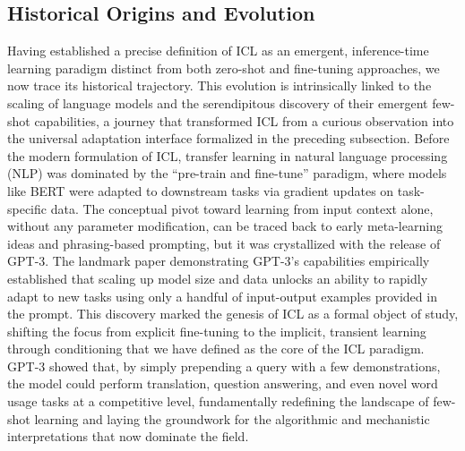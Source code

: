 \documentclass[11pt]{article}
\begin{document}
\subsection{Historical Origins and Evolution}

Having established a precise definition of ICL as an emergent, inference-time learning paradigm distinct from both zero-shot and fine-tuning approaches, we now trace its historical trajectory. This evolution is intrinsically linked to the scaling of language models and the serendipitous discovery of their emergent few-shot capabilities, a journey that transformed ICL from a curious observation into the universal adaptation interface formalized in the preceding subsection. Before the modern formulation of ICL, transfer learning in natural language processing (NLP) was dominated by the ``pre-train and fine-tune'' paradigm, where models like BERT were adapted to downstream tasks via gradient updates on task-specific data. The conceptual pivot toward learning from input context alone, without any parameter modification, can be traced back to early meta-learning ideas and phrasing-based prompting, but it was crystallized with the release of GPT-3. The landmark paper demonstrating GPT-3's capabilities empirically established that scaling up model size and data unlocks an ability to rapidly adapt to new tasks using only a handful of input-output examples provided in the prompt. This discovery marked the genesis of ICL as a formal object of study, shifting the focus from explicit fine-tuning to the implicit, transient learning through conditioning that we have defined as the core of the ICL paradigm. GPT-3 showed that, by simply prepending a query with a few demonstrations, the model could perform translation, question answering, and even novel word usage tasks at a competitive level, fundamentally redefining the landscape of few-shot learning and laying the groundwork for the algorithmic and mechanistic interpretations that now dominate the field.
\end{document}
